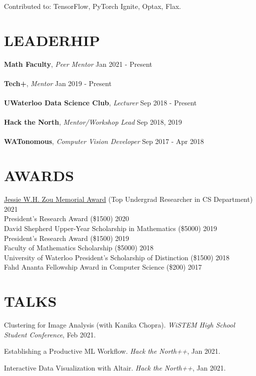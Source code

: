 \documentclass[line,margin]{res}
\newcommand{\experience}[3]{\textbf{#1}, \textit{#2} \hfill #3 \\ \vspace{-4mm}}
\newcommand{\talk}[4]{#1. \textit{#2}, #4. \vspace{-2mm}}
\newcommand{\award}[2]{#1 \hfill #2}
\begin{document}
\begin{resume}
    Contributed to: TensorFlow, PyTorch Ignite, Optax, Flax.

\section{LEADERHIP}
    \experience{Math Faculty}{Peer Mentor}{Jan 2021 - Present} \\
    \experience{Tech+}{Mentor}{Jan 2019 - Present} \\
    \experience{UWaterloo Data Science Club}{Lecturer}{Sep 2018 - Present} \\
    \experience{Hack the North}{Mentor/Workshop Lead}{Sep 2018, 2019} \\
    \experience{WATonomous}{Computer Vision Developer}{Sep 2017 - Apr 2018}

\section{AWARDS}
    \award{\href{https://cs.uwaterloo.ca/news/nicholas-vadivelu-receives-2021-jessie-w-h-zou-memorial-award}{Jessie W.H. Zou Memorial Award} (Top Undergrad Researcher in CS Department)}{2021}\\
    \award{President's Research Award (\$1500)}{2020}\\
    \award{David Shepherd Upper-Year Scholarship in Mathematics (\$5000)}{2019}\\
    \award{President's Research Award (\$1500)}{2019}\\
    \award{Faculty of Mathematics Scholarship (\$5000)}{2018}\\
    \award{University of Waterloo President's Scholarship of Distinction (\$1500)}{2018}\\
    \award{Fahd Ananta Fellowship Award in Computer Science (\$200)}{2017}

\section{TALKS}
    \talk
    {Clustering for Image Analysis (with Kanika Chopra)}
    {WiSTEM High School Student Conference}{Virtual}{Feb 2021}

    \talk
    {Establishing a Productive ML Workflow}
    {Hack the North++}{Virtual}{Jan 2021}

    \talk
    {Interactive Data Visualization with Altair}
    {Hack the North++}{Virtual}{Jan 2021}


\end{resume}
\end{document}
